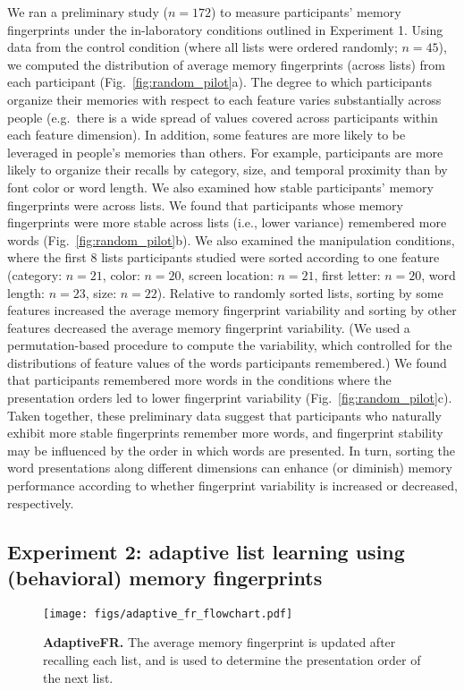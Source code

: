 We ran a preliminary study ($n = 172$) to measure participants' memory
fingerprints under the in-laboratory conditions outlined in Experiment 1. Using
data from the control condition (where all lists were ordered randomly; $n =
45$), we computed the distribution of average memory fingerprints (across
lists) from each participant (Fig.~\ref{fig:random_pilot}a). The degree to
which participants organize their memories with respect to each feature varies
substantially across people (e.g.\ there is a wide spread of values covered
across participants within each feature dimension). In addition, some features
are more likely to be leveraged in people's memories than others. For example,
participants are more likely to organize their recalls by category, size, and
temporal proximity than by font color or word length. We also examined how
stable participants' memory fingerprints were across lists. We found that
participants whose memory fingerprints were more stable across lists (i.e.,
lower variance) remembered more words (Fig.~\ref{fig:random_pilot}b). We also
examined the manipulation conditions, where the first 8 lists participants
studied were sorted according to one feature (category: $n=21$, color: $n=20$,
screen location: $n=21$, first letter: $n=20$, word length: $n=23$, size:
$n=22$). Relative to randomly sorted lists, sorting by some features increased
the average memory fingerprint variability and sorting by other features
decreased the average memory fingerprint variability. (We used a
permutation-based procedure to compute the variability, which controlled for
the distributions of feature values of the words participants remembered.) We
found that participants remembered more words in the conditions where the
presentation orders led to lower fingerprint variability
(Fig.~\ref{fig:random_pilot}c). Taken together, these preliminary data suggest
that participants who naturally exhibit more stable fingerprints remember more
words, and fingerprint stability may be influenced by the order in which words
are presented. In turn, sorting the word presentations along different
dimensions can enhance (or diminish) memory performance according to whether
fingerprint variability is increased or decreased, respectively.

\subsection*{Experiment 2: adaptive list learning using (behavioral) memory fingerprints}
\begin{wrapfigure}[9]{R}{1.6in}
  \vspace{-25pt}
  \begin{center}
    \texttt{[image: figs/adaptive\_fr\_flowchart.pdf]}
  \end{center}
\vspace{-20pt}
  \caption{\footnotesize \textbf{AdaptiveFR.}  The average memory fingerprint is updated after recalling each list, and is used to determine the presentation order of the next list.}
  \label{fig:adaptiveFR_flowchart}
\end{wrapfigure}

